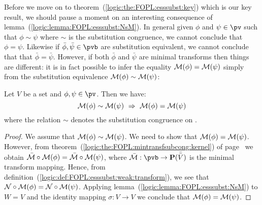 Before we move on to theorem~(\ref{logic:the:FOPL:esssubst:key})
which is our key result, we should pause a moment on an interesting
consequence of lemma~(\ref{logic:lemma:FOPL:esssubst:NsM}). In
general given $\phi$ and $\psi\in\pv$ such that $\phi\sim\psi$ where
$\sim$ is the substitution congruence, we cannot conclude that
$\phi=\psi$. Likewise if $\bar{\phi},\bar{\psi}\in\pvb$ are
substitution equivalent, we cannot conclude that that
$\bar{\phi}=\bar{\psi}$. However, if both $\bar{\phi}$ and
$\bar{\psi}$ are minimal transforms then things are different: it is
in fact possible to infer the equality ${\cal M}(\phi)={\cal
M}(\psi)$ simply from the substitution equivalence ${\cal
M}(\phi)\sim{\cal M}(\psi)$:

\begin{prop}\label{logic:prop:FOPL:esssubst:mintransform:equiv:imp:equal}
Let $V$ be a set and $\phi,\psi\in\pv$. Then we have:
    \[
    {\cal M}(\phi)\sim{\cal M}(\psi)\ \Rightarrow\ {\cal
    M}(\phi)={\cal M}(\psi)
    \]
where the relation $\sim$ denotes the substitution congruence on
\pvb.
\end{prop}
\begin{proof}
We assume that ${\cal M}(\phi)\sim{\cal M}(\psi)$. We need to show
that ${\cal M}(\phi)={\cal M}(\psi)$. However, from
theorem~(\ref{logic:the:FOPL:mintransfsubcong:kernel}) of
page~\pageref{logic:the:FOPL:mintransfsubcong:kernel} we obtain
$\bar{\cal M}\circ{\cal M}(\phi)=\bar{\cal M}\circ{\cal M}(\psi)$,
where $\bar{\cal M}:\pvb\to{\bf P}(\bar{\bar{V}})$ is the minimal
transform mapping. Hence, from
definition~(\ref{logic:def:FOPL:esssubst:weak:transform}), we see
that ${\cal N}\circ{\cal M}(\phi)={\cal N}\circ{\cal M}(\psi)$.
Applying lemma~(\ref{logic:lemma:FOPL:esssubst:NsM}) to $W=V$ and
the identity mapping $\sigma:V\to V$ we conclude that ${\cal
M}(\phi)={\cal M}(\psi)$.
\end{proof}

